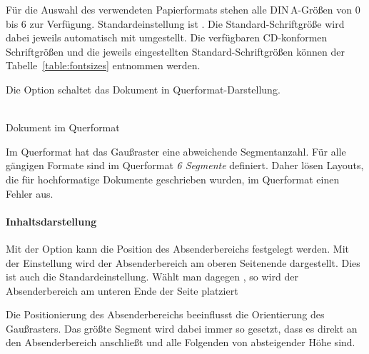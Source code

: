 Für die Auswahl des verwendeten Papierformats stehen alle DIN\,A-Größen von
0 bis 6 zur Verfügung. Standardeinstellung ist .
Die Standard-Schriftgröße wird dabei jeweils automatisch mit umgestellt.
Die verfügbaren \acs{CD}-konformen Schriftgrößen und die jeweils eingestellten
Standard-Schriftgrößen können der Tabelle~\ref{table:fontsizes}
entnommen werden.

\begin{Declaration}
\end{Declaration}

Die Option  schaltet das Dokument in Querformat-Darstellung.

\begin{center}
  \\
  Dokument im Querformat
\end{center}

\begin{important}
  Im Querformat hat das Gaußraster eine abweichende
  Segmentanzahl. Für alle gängigen Formate sind im Querformat \emph{6 Segmente}
  definiert. Daher lösen Layouts, die für hochformatige Dokumente
  geschrieben wurden, im Querformat einen Fehler aus. %
\end{important}

\paragraph{Inhaltsdarstellung}\hfill

\begin{Declaration}
\end{Declaration}

Mit der Option  kann die Position des Absenderbereichs
festgelegt werden. Mit der Einstellung  wird
der Absenderbereich am oberen Seitenende dargestellt. Dies ist auch die
Standardeinstellung. Wählt man dagegen , so
wird der Absenderbereich am unteren Ende der Seite platziert

\begin{important}
  Die Positionierung des Absenderbereichs beeinflusst die Orientierung des
  Gaußrasters. Das größte Segment wird dabei immer so gesetzt, dass es direkt
  an den Absenderbereich anschließt und alle Folgenden von absteigender Höhe sind.
\end{important}



